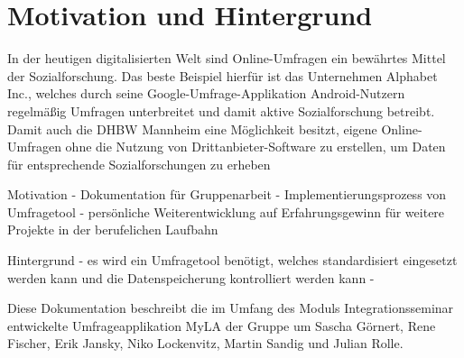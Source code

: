 \section{Motivation und Hintergrund}

In der heutigen digitalisierten Welt sind Online-Umfragen ein bewährtes Mittel der Sozialforschung.
Das beste Beispiel hierfür ist das Unternehmen Alphabet Inc., welches durch seine Google-Umfrage-Applikation Android-Nutzern regelmäßig Umfragen unterbreitet und damit aktive Sozialforschung betreibt.
Damit auch die \ac{DHBW} Mannheim eine Möglichkeit besitzt, eigene Online-Umfragen ohne die Nutzung von Drittanbieter-Software zu erstellen, um Daten für entsprechende Sozialforschungen zu erheben

Motivation
- Dokumentation für Gruppenarbeit
- Implementierungsprozess von Umfragetool
- persönliche Weiterentwicklung auf Erfahrungsgewinn für weitere Projekte in der berufelichen Laufbahn

Hintergrund
- es wird ein Umfragetool benötigt, welches standardisiert eingesetzt werden kann und die Datenspeicherung kontrolliert werden kann
- 

Diese Dokumentation beschreibt die im Umfang des Moduls Integrationsseminar entwickelte Umfrageapplikation MyLA der Gruppe um Sascha Görnert, Rene Fischer, Erik Jansky, Niko Lockenvitz, Martin Sandig und Julian Rolle.
